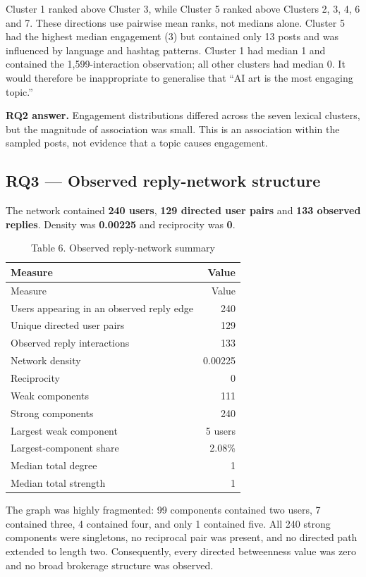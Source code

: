 \documentclass[
]{article}
\begin{document}
Cluster 1 ranked above Cluster 3, while Cluster 5 ranked above Clusters
2, 3, 4, 6 and 7. These directions use pairwise mean ranks, not medians
alone. Cluster 5 had the highest median engagement (3) but contained
only 13 posts and was influenced by language and hashtag patterns.
Cluster 1 had median 1 and contained the 1,599-interaction observation;
all other clusters had median 0. It would therefore be inappropriate to
generalise that ``AI art is the most engaging topic.''

\textbf{RQ2 answer.} Engagement distributions differed across the seven
lexical clusters, but the magnitude of association was small. This is an
association within the sampled posts, not evidence that a topic causes
engagement.

\subsection{RQ3 --- Observed reply-network
structure}\label{rq3-observed-reply-network-structure}

The network contained \textbf{240 users}, \textbf{129 directed user
pairs} and \textbf{133 observed replies}. Density was \textbf{0.00225}
and reciprocity was \textbf{0}.

\begin{longtable}[]{@{}lr@{}}
\caption{Table 6. Observed reply-network summary}\tabularnewline
\toprule\noalign{}
Measure & Value \\
\midrule\noalign{}
\endfirsthead
\toprule\noalign{}
Measure & Value \\
\midrule\noalign{}
\endhead
\bottomrule\noalign{}
\endlastfoot
Users appearing in an observed reply edge & 240 \\
Unique directed user pairs & 129 \\
Observed reply interactions & 133 \\
Network density & 0.00225 \\
Reciprocity & 0 \\
Weak components & 111 \\
Strong components & 240 \\
Largest weak component & 5 users \\
Largest-component share & 2.08\% \\
Median total degree & 1 \\
Median total strength & 1 \\
\end{longtable}

The graph was highly fragmented: 99 components contained two users, 7
contained three, 4 contained four, and only 1 contained five. All 240
strong components were singletons, no reciprocal pair was present, and
no directed path extended to length two. Consequently, every directed
betweenness value was zero and no broad brokerage structure was
observed.
\end{document}
